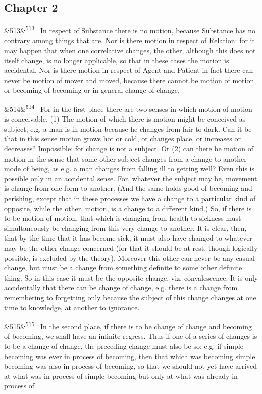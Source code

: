 \documentclass[12pt]{article}
\newcommand{\para}[1][]{\par\noindent\ifx&#1&\else\textsuperscript{\footnotesize #1}~\fi}
\begin{document}
\subsection*{Chapter 2}

\para[513] In respect of Substance there is no motion, because Substance has no contrary among things that are. Nor is there motion in respect of Relation: for it may happen that when one correlative changes, the other, although this does not itself change, is no longer applicable, so that in these cases the motion is accidental. Nor is there motion in respect of Agent and Patient-in fact there can never be motion of mover and moved, because there cannot be motion of motion or becoming of becoming or in general change of change.

\para[514] For in the first place there are two senses in which motion of motion is conceivable. (1) The motion of which there is motion might be conceived as subject; e.g. a man is in motion because he changes from fair to dark. Can it be that in this sense motion grows hot or cold, or changes place, or increases or decreases? Impossible: for change is not a subject. Or (2) can there be motion of motion in the sense that some other subject changes from a change to another mode of being, as e.g. a man changes from falling ill to getting well? Even this is possible only in an accidental sense. For, whatever the subject may be, movement is change from one form to another. (And the same holds good of becoming and perishing, except that in these processes we have a change to a particular kind of opposite, while the other, motion, is a change to a different kind.) So, if there is to be motion of motion, that which is changing from health to sickness must simultaneously be changing from this very change to another. It is clear, then, that by the time that it has become sick, it must also have changed to whatever may be the other change concerned (for that it should be at rest, though logically possible, is excluded by the theory). Moreover this other can never be any casual change, but must be a change from something definite to some other definite thing. So in this case it must be the opposite change, viz. convalescence. It is only accidentally that there can be change of change, e.g. there is a change from remembering to forgetting only because the subject of this change changes at one time to knowledge, at another to ignorance.

\para[515] In the second place, if there is to be change of change and becoming of becoming, we shall have an infinite regress. Thus if one of a series of changes is to be a change of change, the preceding change must also be so: e.g. if simple becoming was ever in process of becoming, then that which was becoming simple becoming was also in process of becoming, so that we should not yet have arrived at what was in process of simple becoming but only at what was already in process of
\end{document}
